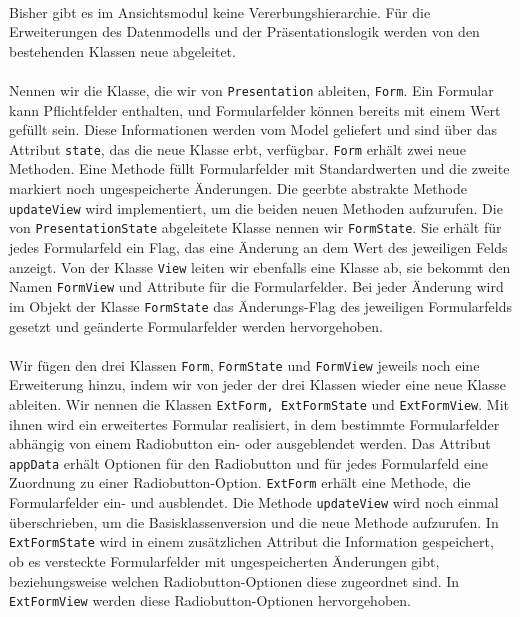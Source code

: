 \documentclass{article}
\begin{document}
\paragraph{}
Bisher gibt es im Ansichtsmodul keine Vererbungshierarchie. Für die Erweiterungen des Datenmodells und der Präsentationslogik werden von den bestehenden Klassen neue abgeleitet.
\paragraph{}
Nennen wir die Klasse, die wir von \texttt{Presentation} ableiten, \texttt{Form}. Ein Formular kann Pflichtfelder enthalten, und Formularfelder können bereits mit einem Wert gefüllt sein. Diese Informationen werden vom Model geliefert und sind über das Attribut \texttt{state}, das die neue Klasse erbt, verfügbar. \texttt{Form} erhält zwei neue Methoden. Eine Methode füllt Formularfelder mit Standardwerten und die zweite markiert noch ungespeicherte Änderungen. Die geerbte abstrakte Methode \texttt{updateView} wird implementiert, um die beiden neuen Methoden aufzurufen. Die von \texttt{PresentationState} abgeleitete Klasse nennen wir \texttt{FormState}. Sie erhält für jedes Formularfeld ein Flag, das eine Änderung an dem Wert des jeweiligen Felds anzeigt. Von der Klasse \texttt{View} leiten wir ebenfalls eine Klasse ab, sie bekommt den Namen \texttt{FormView} und Attribute für die Formularfelder. Bei jeder Änderung wird im Objekt der Klasse \texttt{FormState} das Änderungs-Flag des jeweiligen Formularfelds gesetzt und geänderte Formularfelder werden hervorgehoben.

\paragraph{}
Wir fügen den drei Klassen \texttt{Form}, \texttt{FormState} und \texttt{FormView} jeweils noch eine Erweiterung hinzu, indem wir von jeder der drei Klassen wieder eine neue Klasse ableiten. Wir nennen die Klassen \texttt{ExtForm, ExtFormState} und \texttt{ExtFormView}. Mit ihnen wird ein erweitertes Formular realisiert, in dem bestimmte Formularfelder abhängig von einem Radiobutton ein- oder ausgeblendet werden. Das Attribut \texttt{appData} erhält Optionen für den Radiobutton und für jedes Formularfeld eine Zuordnung zu einer Radiobutton-Option. \texttt{ExtForm} erhält eine Methode, die Formularfelder ein- und ausblendet. Die Methode \texttt{updateView} wird noch einmal überschrieben, um die Basisklassenversion und die neue Methode aufzurufen. In \texttt{ExtFormState} wird in einem zusätzlichen Attribut die Information gespeichert, ob es versteckte Formularfelder mit ungespeicherten Änderungen gibt, beziehungsweise welchen Radiobutton-Optionen diese zugeordnet sind. In \texttt{ExtFormView} werden diese Radiobutton-Optionen hervorgehoben.
\end{document}
